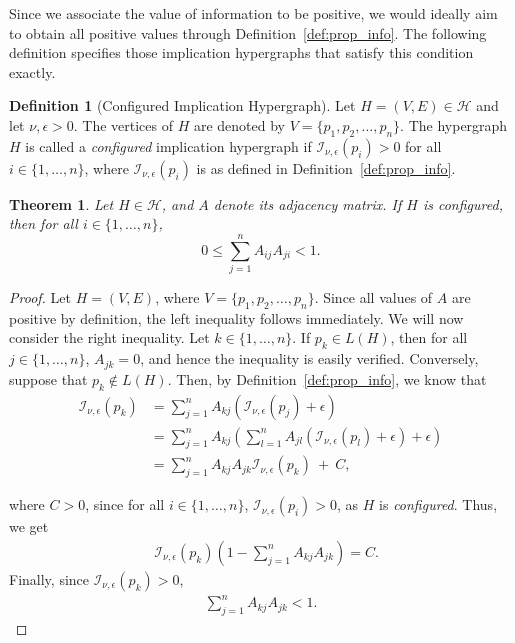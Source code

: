 \documentclass[11pt]{article}
\theoremstyle{definition}
\newtheorem{definition}{Definition}[section]
\theoremstyle{plain}
\newtheorem{theorem}{Theorem}[section]
\theoremstyle{remark}
\begin{document}
Since we associate the value of information to be positive, we would ideally aim to obtain all positive values through Definition~\ref{def:prop_info}. The following definition specifies those implication hypergraphs that satisfy this condition exactly.

\begin{definition}[Configured Implication Hypergraph]\label{def:rep}
Let \( H = (V, E) \in \mathcal{H} \) and let \( \nu, \epsilon > 0 \). The vertices of \( H \) are denoted by \( V = \{p_1, p_2, \ldots, p_n\} \). The hypergraph \( H \) is called a \emph{configured} implication hypergraph if \( \mathcal{I}_{\nu, \epsilon}(p_i) > 0 \) for all \( i \in \{1, \ldots, n\} \), where \( \mathcal{I}_{\nu, \epsilon}(p_i) \) is as defined in Definition~\ref{def:prop_info}.
\end{definition}


\begin{theorem}\label{thm:nec}
\normalfont
Let \( H \in \mathcal{H} \), and \( A \) denote its adjacency matrix. If \( H \) is \emph{configured}, then for all \( i \in \{1, \ldots, n\} \),
\[
0 \leq \sum_{j=1}^{n} A_{ij} A_{ji} < 1.
\]
\end{theorem}

\begin{proof}
Let $ H = (V, E)$, where \( V = \{p_1, p_2, \ldots, p_n\} \). Since all values of $A$ are positive by definition, the left inequality follows immediately. We will now consider the right inequality. Let $k \in \{1,\ldots,n\}$. If $p_k\in L(H)$, then for all $j \in \{1,\ldots,n\}$, $A_{jk}=0$, and hence the inequality is easily verified. Conversely, suppose that $p_k\notin L(H)$. Then, by Definition~\ref{def:prop_info}, we know that
\begin{align*}
\mathcal{I}_{\nu, \epsilon}(p_k) &= \sum_{j=1}^{n} A_{kj} (\mathcal{I}_{\nu, \epsilon}(p_j) + \epsilon) \\
&= \sum_{j=1}^{n} A_{kj} \left(\sum_{l=1}^{n} A_{jl}(\mathcal{I}_{\nu, \epsilon}(p_l) + \epsilon) + \epsilon\right) \\
&= \sum_{j=1}^{n} A_{kj}A_{jk} \mathcal{I}_{\nu, \epsilon}(p_k) \: + \:C,
\end{align*}

where $C>0$, since for all $i \in \{1,\ldots,n\}$, $\mathcal{I}_{\nu, \epsilon}(p_i) > 0$, as $H$ is \emph{configured}. Thus, we get
\begin{align*}
&\mathcal{I}_{\nu, \epsilon}(p_k)\left(1-\sum_{j=1}^{n} A_{kj}A_{jk}\right)=C.
\end{align*}
Finally, since $\mathcal{I}_{\nu, \epsilon}(p_k) > 0$,
\begin{align*}
\sum_{j=1}^{n} A_{kj}A_{jk} < 1.
\end{align*}

\end{proof}
\end{document}

